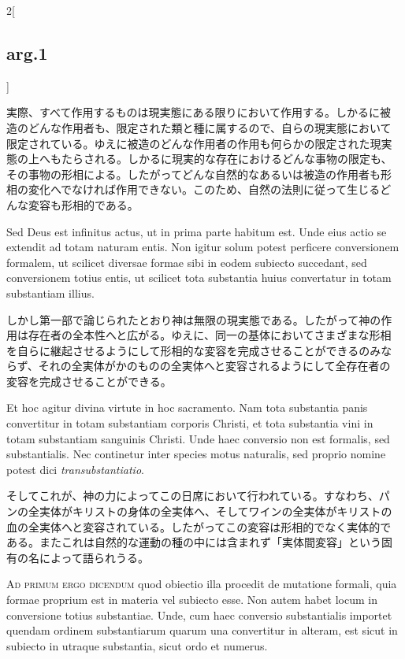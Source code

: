 \documentclass[paper=a4paper,fontsize=10pt,jafontsize=9pt,titlepage]{jlreq}
\begin{document}
\begin{paracol}{2}[\subsection{arg.1}]
\switchcolumn

実際、すべて作用するものは現実態にある限りにおいて作用する。しかるに被
造のどんな作用者も、限定された類と種に属するので、自らの現実態において
限定されている。ゆえに被造のどんな作用者の作用も何らかの限定された現実
態の上へもたらされる。しかるに現実的な存在におけるどんな事物の限定も、
その事物の形相による。したがってどんな自然的なあるいは被造の作用者も形
相の変化へでなければ作用できない。このため、自然の法則に従って生じるど
んな変容も形相的である。

\switchcolumn*

Sed Deus est infinitus actus, ut in prima parte habitum est. Unde eius
actio se extendit ad totam naturam entis. Non igitur solum potest
perficere conversionem formalem, ut scilicet diversae formae sibi in
eodem subiecto succedant, sed conversionem totius entis, ut scilicet
tota substantia huius convertatur in totam substantiam illius.

\switchcolumn

しかし第一部で論じられたとおり神は無限の現実態である。したがって神の作
用は存在者の全本性へと広がる。ゆえに、同一の基体においてさまざまな形相
を自らに継起させるようにして形相的な変容を完成させることができるのみな
らず、それの全実体がかのものの全実体へと変容されるようにして全存在者の
変容を完成させることができる。

\switchcolumn*

Et hoc agitur divina virtute in hoc sacramento. Nam tota substantia
panis convertitur in totam substantiam corporis Christi, et tota
substantia vini in totam substantiam sanguinis Christi. Unde haec
conversio non est formalis, sed substantialis. Nec continetur inter
species motus naturalis, sed proprio nomine potest dici {\itshape
transubstantiatio}.

\switchcolumn

そしてこれが、神の力によってこの日席において行われている。すなわち、パ
ンの全実体がキリストの身体の全実体へ、そしてワインの全実体がキリストの
血の全実体へと変容されている。したがってこの変容は形相的でなく実体的で
ある。またこれは自然的な運動の種の中には含まれず「実体間変容」という固
有の名によって語られうる。

\switchcolumn*[\subsection{ad.1}]

{\scshape Ad primum ergo dicendum} quod obiectio illa procedit de
mutatione formali, quia formae proprium est in materia vel subiecto
esse. Non autem habet locum in conversione totius substantiae. Unde,
cum haec conversio substantialis importet quendam ordinem
substantiarum quarum una convertitur in alteram, est sicut in subiecto
in utraque substantia, sicut ordo et numerus.


\end{paracol}
\end{document}
